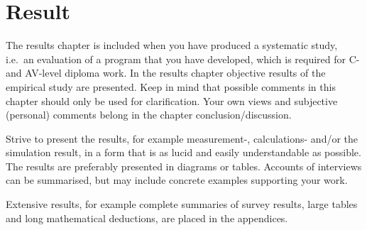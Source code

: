 \section{Result}\label{sec:result}
The results chapter is included when you have produced a systematic study, 
i.e.\ an evaluation of a program that you have developed, which is required for
C- and AV-level diploma work. In the results chapter objective results of the
empirical study are presented. Keep in mind that possible comments in this
chapter should only be used for clarification. Your own views and subjective
(personal) comments belong in the chapter conclusion/discussion.

Strive to present the results, for example measurement-, calculations- and/or
the simulation result, in a form that is as lucid and easily understandable as
possible. The results are preferably presented in diagrams or tables. Accounts
of interviews can be summarised, but may include concrete examples supporting
your work.

Extensive results, for example complete summaries of survey results, large
tables and long mathematical deductions, are placed in the appendices.

